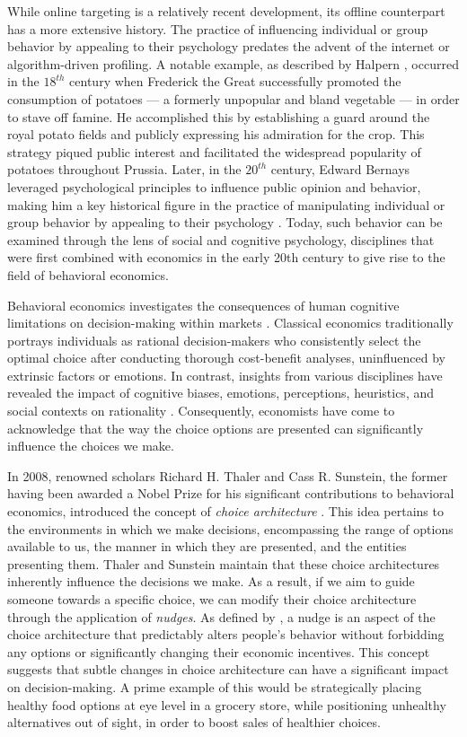 \documentclass[preprint]{acmart}
\begin{document}
While online targeting is a relatively recent development, its offline counterpart has a more extensive history. The practice of influencing individual or group behavior by appealing to their psychology predates the advent of the internet or algorithm-driven profiling. A notable example, as described by Halpern \cite{halpern2015}, occurred in the $18^{th}$ century when Frederick the Great successfully promoted the consumption of potatoes --- a formerly unpopular and bland vegetable --- in order to stave off famine. He accomplished this by establishing a guard around the royal potato fields and publicly expressing his admiration for the crop. This strategy piqued public interest and facilitated the widespread popularity of potatoes throughout Prussia. Later, in the $20^{th}$ century, Edward Bernays leveraged psychological principles to influence public opinion and behavior, making him a key historical figure in the practice of manipulating individual or group behavior by appealing to their psychology \cite{bernays1947engineering,bernays1928manipulating}. Today, such behavior can be examined through the lens of social and cognitive psychology, disciplines that were first combined with economics in the early 20th century to give rise to the field of behavioral economics.


Behavioral economics investigates the consequences of human cognitive limitations on decision-making within markets \cite{mullainathan2001}. Classical economics traditionally portrays individuals as rational decision-makers who consistently select the optimal choice after conducting thorough cost-benefit analyses, uninfluenced by extrinsic factors or emotions. In contrast, insights from various disciplines have revealed the impact of cognitive biases, emotions, perceptions, heuristics, and social contexts on rationality \cite{halpern2015}. Consequently, economists have come to acknowledge that the way the choice options are presented can significantly influence the choices we make.



In 2008, renowned scholars Richard H. Thaler and Cass R. Sunstein, the former having been awarded a Nobel Prize for his significant contributions to behavioral economics, introduced the concept of \emph{choice architecture} \cite{thaler2008}. This idea pertains to the environments in which we make decisions, encompassing the range of options available to us, the manner in which they are presented, and the entities presenting them. Thaler and Sunstein maintain that these choice architectures inherently influence the decisions we make. As a result, if we aim to guide someone towards a specific choice, we can modify their choice architecture through the application of \emph{nudges}. As defined by \citet[p.6]{thaler2008}, a nudge is an aspect of the choice architecture that predictably alters people's behavior without forbidding any options or significantly changing their economic incentives. This concept suggests that subtle changes in choice architecture can have a significant impact on decision-making. A prime example of this would be strategically placing healthy food options at eye level in a grocery store, while positioning unhealthy alternatives out of sight, in order to boost sales of healthier choices.
\end{document}
